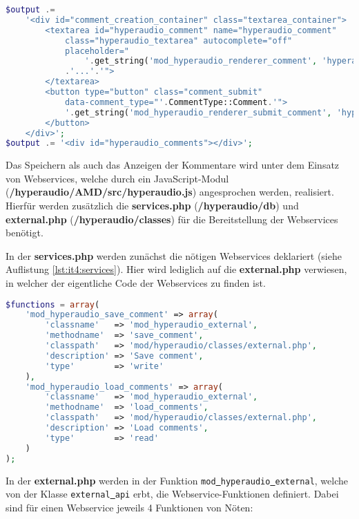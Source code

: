 \begin{lstlisting}[language=php,
             linewidth=\textwidth,
             caption={Ausschnitt der \textbf{renderer.php} in der 4. Iteration},
             label={lst:it4:renderer}]
$output .=
    '<div id="comment_creation_container" class="textarea_container">
        <textarea id="hyperaudio_comment" name="hyperaudio_comment"
            class="hyperaudio_textarea" autocomplete="off"
            placeholder="
                '.get_string('mod_hyperaudio_renderer_comment', 'hyperaudio')
            .'...'.'">
        </textarea>
        <button type="button" class="comment_submit"
            data-comment_type="'.CommentType::Comment.'">
            '.get_string('mod_hyperaudio_renderer_submit_comment', 'hyperaudio').'
        </button>
    </div>';
$output .= '<div id="hyperaudio_comments"></div>';
\end{lstlisting}

Das Speichern als auch das Anzeigen der Kommentare wird unter dem Einsatz von Webservices, welche durch ein JavaScript-Modul (\textbf{/hyperaudio/AMD/src/hyperaudio.js}) angesprochen werden, realisiert. Hierfür werden zusätzlich die \textbf{services.php} (\textbf{/hyperaudio/db}) und \textbf{external.php} (\textbf{/hyperaudio/classes}) für die Bereitstellung der Webservices benötigt.

In der \textbf{services.php} werden zunächst die nötigen Webservices deklariert (siehe Auflistung \ref{lst:it4:services}). Hier wird lediglich auf die \textbf{external.php} verwiesen, in welcher der eigentliche Code der Webservices zu finden ist.

\begin{lstlisting}[language=php,
             linewidth=\textwidth,
             caption={\textbf{services.php} in der 4. Iteration},
             label={lst:it4:services}]
$functions = array(
    'mod_hyperaudio_save_comment' => array(
        'classname'   => 'mod_hyperaudio_external',
        'methodname'  => 'save_comment',
        'classpath'   => 'mod/hyperaudio/classes/external.php',
        'description' => 'Save comment',
        'type'        => 'write'
    ),
    'mod_hyperaudio_load_comments' => array(
        'classname'   => 'mod_hyperaudio_external',
        'methodname'  => 'load_comments',
        'classpath'   => 'mod/hyperaudio/classes/external.php',
        'description' => 'Load comments',
        'type'        => 'read'
    )
);
\end{lstlisting}

In der \textbf{external.php} werden in der Funktion \texttt{mod\underline{{ }}hyperaudio\underline{{ }}external}, welche von der Klasse \texttt{external\underline{{ }}api} erbt, die Webservice-Funktionen definiert. Dabei sind für einen Webservice jeweils 4 Funktionen von Nöten:

